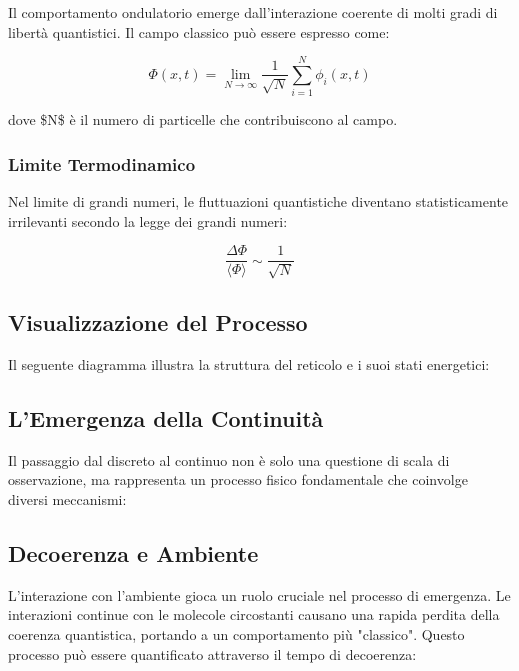 \documentclass[a4paper,11pt]{article}
\begin{document}
Il comportamento ondulatorio emerge dall'interazione coerente di molti
gradi di libertà quantistici. Il campo classico può essere espresso
come:

\begin{displaymath}
\Phi(x,t) = \lim_{N \to \infty} \frac{1}{\sqrt{N}} \sum_{i=1}^N \phi_i(x,t)
\end{displaymath}

dove \$N\$ è il numero di particelle che contribuiscono al campo.

\subsubsection{Limite Termodinamico}\hypertarget{limite-termodinamico}{}\label{limite-termodinamico}

Nel limite di grandi numeri, le fluttuazioni quantistiche diventano
statisticamente irrilevanti secondo la legge dei grandi numeri:

\begin{displaymath}
\frac{\Delta \Phi}{\langle \Phi \rangle} \sim \frac{1}{\sqrt{N}}
\end{displaymath}

\subsection{Visualizzazione del Processo}\hypertarget{visualizzazione-del-processo}{}\label{visualizzazione-del-processo}

Il seguente diagramma illustra la struttura del reticolo e i suoi stati
energetici:

\subsection{L'Emergenza della Continuità}\hypertarget{lemergenza-della-continuit}{}\label{lemergenza-della-continuit}

Il passaggio dal discreto al continuo non è solo una questione di scala
di osservazione, ma rappresenta un processo fisico fondamentale che
coinvolge diversi meccanismi:

\subsection{Decoerenza e Ambiente}\hypertarget{decoerenza-e-ambiente}{}\label{decoerenza-e-ambiente}

L'interazione con l'ambiente gioca un ruolo cruciale nel processo di
emergenza. Le interazioni continue con le molecole circostanti causano
una rapida perdita della coerenza quantistica, portando a un
comportamento più "classico". Questo processo può essere quantificato
attraverso il tempo di decoerenza:
\end{document}
